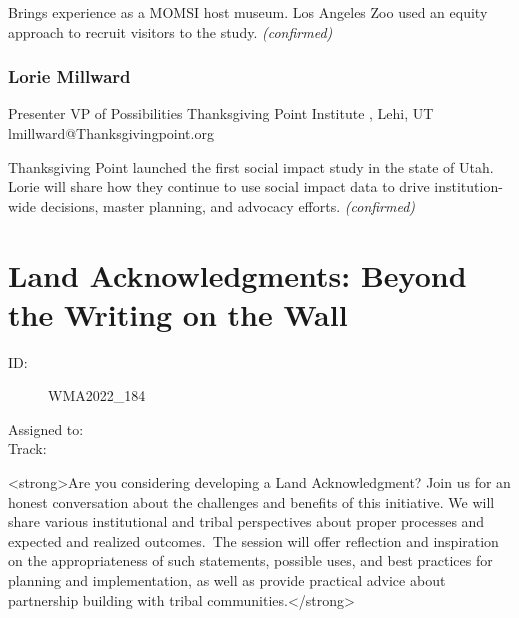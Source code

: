 \documentclass{report}
\begin{document}
                

                Brings experience as a MOMSI host museum. Los Angeles Zoo used an equity approach to recruit visitors to the study.
                \emph{ (confirmed) }
              

              
                \subsubsection*{ Lorie Millward }
                Presenter\newline
                VP of Possibilities\newline
                Thanksgiving Point Institute , Lehi, UT
                \newline
                lmillward@Thanksgivingpoint.org\newline
                
                

                Thanksgiving Point launched the first social impact study in the state of Utah. Lorie will share how they continue to use social impact data to drive institution-wide decisions, master planning, and advocacy efforts.
                \emph{ (confirmed) }
              
        
          \newpage
          \section{ Land Acknowledgments: Beyond the Writing on the Wall }
            \begin{description}
              \item [ID:]
              WMA2022\_184

              \item [Assigned to:]
                \item [Track:]
              \end{description}

              <strong>Are you considering developing a Land Acknowledgment? Join us for an honest conversation about the challenges and benefits of this initiative. We will share various institutional and tribal perspectives about proper processes and expected and realized outcomes. The session will offer reflection and inspiration on the appropriateness of such statements, possible uses, and best practices for planning and implementation, as well as provide practical advice about partnership building with tribal communities.</strong>
\end{document}
